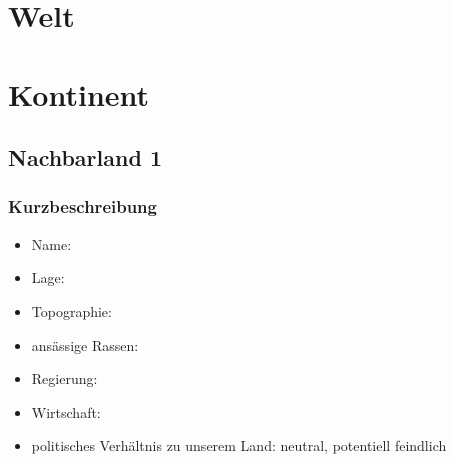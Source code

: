 \chapter{Welt}
\chapter{Kontinent}
\section{Nachbarland 1}
\subsection{Kurzbeschreibung}
\begin{itemize}
	\item Name: 
	\item Lage:
	\item Topographie:
	\item ansässige Rassen:
	\item Regierung:
	\item Wirtschaft:
	\item politisches Verhältnis zu unserem Land: neutral, potentiell feindlich
\end{itemize}

